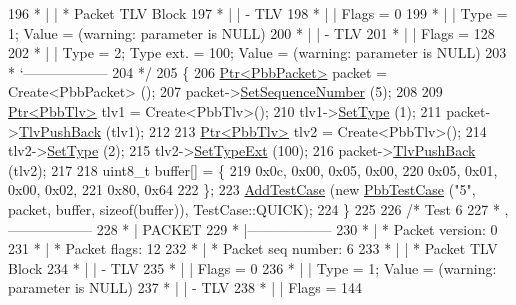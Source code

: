\begin{DoxyCode}
196 \textcolor{comment}{         * |    | * Packet TLV Block}
197 \textcolor{comment}{         * |    |     - TLV}
198 \textcolor{comment}{         * |    |         Flags = 0}
199 \textcolor{comment}{         * |    |         Type = 1; Value = (warning: parameter is NULL)}
200 \textcolor{comment}{         * |    |     - TLV}
201 \textcolor{comment}{         * |    |         Flags = 128}
202 \textcolor{comment}{         * |    |         Type = 2; Type ext. = 100; Value = (warning: parameter is NULL)}
203 \textcolor{comment}{         * `------------------}
204 \textcolor{comment}{   */}
205   \{
206     \hyperlink{classns3_1_1Ptr}{Ptr<PbbPacket>} packet = Create<PbbPacket> ();
207     packet->\hyperlink{classns3_1_1PbbPacket_a7d6a1602be86109760d0f26ff9bbbb8e}{SetSequenceNumber} (5);
208 
209     \hyperlink{classns3_1_1Ptr}{Ptr<PbbTlv>} tlv1 = Create<PbbTlv>();
210     tlv1->\hyperlink{classns3_1_1PbbTlv_a90a0452018ed364ac37c3ad116dd718b}{SetType} (1);
211     packet->\hyperlink{classns3_1_1PbbPacket_a34935793e729a106c176db99c969cb42}{TlvPushBack} (tlv1);
212 
213     \hyperlink{classns3_1_1Ptr}{Ptr<PbbTlv>} tlv2 = Create<PbbTlv>();
214     tlv2->\hyperlink{classns3_1_1PbbTlv_a90a0452018ed364ac37c3ad116dd718b}{SetType} (2);
215     tlv2->\hyperlink{classns3_1_1PbbTlv_aebc3df25cac008223fda7d3954c17638}{SetTypeExt} (100);
216     packet->\hyperlink{classns3_1_1PbbPacket_a34935793e729a106c176db99c969cb42}{TlvPushBack} (tlv2);
217 
218     uint8\_t buffer[] = \{
219       0x0c, 0x00, 0x05, 0x00,
220       0x05, 0x01, 0x00, 0x02,
221       0x80, 0x64
222     \};
223     \hyperlink{classns3_1_1TestCase_a3718088e3eefd5d6454569d2e0ddd835}{AddTestCase} (\textcolor{keyword}{new} \hyperlink{classPbbTestCase}{PbbTestCase} (\textcolor{stringliteral}{"5"}, packet, buffer, \textcolor{keyword}{sizeof}(buffer)), 
      TestCase::QUICK);
224   \}
225 
226   \textcolor{comment}{/* Test 6}
227 \textcolor{comment}{         * ,------------------}
228 \textcolor{comment}{         * |  PACKET}
229 \textcolor{comment}{         * |------------------}
230 \textcolor{comment}{         * | * Packet version:    0}
231 \textcolor{comment}{         * | * Packet flags:  12}
232 \textcolor{comment}{         * | * Packet seq number: 6}
233 \textcolor{comment}{         * |    | * Packet TLV Block}
234 \textcolor{comment}{         * |    |     - TLV}
235 \textcolor{comment}{         * |    |         Flags = 0}
236 \textcolor{comment}{         * |    |         Type = 1; Value = (warning: parameter is NULL)}
237 \textcolor{comment}{         * |    |     - TLV}
238 \textcolor{comment}{         * |    |         Flags = 144}

\end{DoxyCode}
